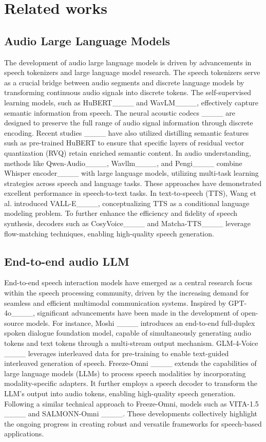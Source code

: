 \section{Related works}
\subsection{Audio Large Language Models}
The development of audio large language models is driven by advancements in speech tokenizers and large language model research. The speech tokenizers serve as a crucial bridge between audio segments and discrete language models by transforming continuous audio signals into discrete tokens. The self-supervised learning models, such as HuBERT____ and WavLM____, effectively capture semantic information from speech. The neural acoustic codecs ____ are designed to preserve the full range of audio signal information through discrete encoding. Recent studies ____ have also utilized distilling semantic features sush as pre-trained HuBERT to ensure that specific layers of residual vector quantization (RVQ) retain enriched semantic content. In audio understanding, methods like Qwen-Audio____, Wavllm____, and Pengi____ combine Whisper encoder____ with large language models, utilizing multi-task learning strategies across speech and language tasks. These approaches have demonstrated excellent performance in speech-to-text tasks. In text-to-speech (TTS), Wang et al. introduced VALL-E____, conceptualizing TTS as a conditional language modeling problem. To further enhance the efficiency and fidelity of speech synthesis, decoders such as CosyVoice____ and Matcha-TTS____ leverage flow-matching techniques, enabling high-quality speech generation.


\subsection{End-to-end audio LLM}
End-to-end speech interaction models have emerged as a central research focus within the speech processing community, driven by the increasing demand for seamless and efficient multimodal communication systems. Inspired by GPT-4o____, significant advancements have been made in the development of open-source models. For instance, Moshi ____ introduces an end-to-end full-duplex spoken dialogue foundation model, capable of simultaneously generating audio tokens and text tokens through a multi-stream output mechanism. GLM-4-Voice ____ leverages interleaved data for pre-training to enable text-guided interleaved generation of speech. Freeze-Omni ____ extends the capabilities of large language models (LLMs) to process speech modalities by incorporating modality-specific adapters. It further employs a speech decoder to transform the LLM's output into audio tokens, enabling high-quality speech generation. Following a similar technical approach to Freeze-Omni, models such as VITA-1.5 ____ and SALMONN-Omni ____. These developments collectively highlight the ongoing progress in creating robust and versatile frameworks for speech-based applications.